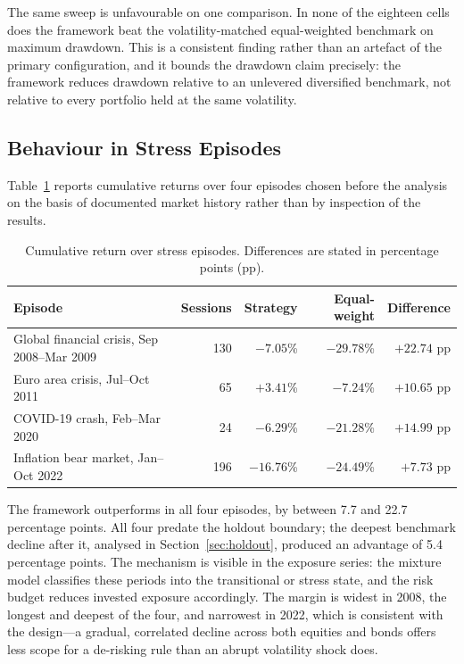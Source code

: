 \documentclass{singlecol-new}
\theoremstyle{TH}{
\newtheorem{lemma}{Lemma}
\newtheorem{theorem}[lemma]{Theorem}
\newtheorem{corrolary}[lemma]{Corrolary}
\newtheorem{conjecture}[lemma]{Conjecture}
\newtheorem{proposition}[lemma]{Proposition}
\newtheorem{claim}[lemma]{Claim}
\newtheorem{stheorem}[lemma]{Wrong Theorem}
\newtheorem{algorithm}{Algorithm}
}
\theoremstyle{THrm}{
\newtheorem{definition}{Definition}[section]
\newtheorem{question}{Question}[section]
\newtheorem{remark}{Remark}
\newtheorem{scheme}{Scheme}
}
\theoremstyle{THhit}{
\newtheorem{case}{Case}[section]
}
\begin{document}
The same sweep is unfavourable on one comparison. In none of the eighteen cells does
the framework beat the volatility-matched equal-weighted benchmark on maximum drawdown.
This is a consistent finding rather than an artefact of the primary configuration, and
it bounds the drawdown claim precisely: the framework reduces drawdown relative to an
unlevered diversified benchmark, not relative to every portfolio held at the same
volatility.

\subsection{Behaviour in Stress Episodes}

Table~\ref{tab:episodes} reports cumulative returns over four episodes chosen before the analysis on the
basis of documented market history rather than by inspection of the results.

\begin{table}[!ht]
\centering
\caption{Cumulative return over stress episodes. Differences are stated in percentage
points (pp).}
\label{tab:episodes}
\small
\begin{tabular}{p{3.6cm}rrrr}
\hline
\textbf{Episode} & \textbf{Sessions} & \textbf{Strategy} & \textbf{Equal-weight} & \textbf{Difference} \\
\hline
Global financial crisis, Sep 2008--Mar 2009 & 130 & $-7.05$\% & $-29.78$\% & $+22.74$ pp \\
Euro area crisis, Jul--Oct 2011 & 65 & $+3.41$\% & $-7.24$\% & $+10.65$ pp \\
COVID-19 crash, Feb--Mar 2020 & 24 & $-6.29$\% & $-21.28$\% & $+14.99$ pp \\
Inflation bear market, Jan--Oct 2022 & 196 & $-16.76$\% & $-24.49$\% & $+7.73$ pp \\
\hline
\end{tabular}
\end{table}

The framework outperforms in all four episodes, by between 7.7 and 22.7 percentage
points. All four predate the holdout boundary; the deepest benchmark decline after it,
analysed in Section~\ref{sec:holdout}, produced an advantage of 5.4 percentage points. The mechanism is visible in the exposure series: the mixture model classifies
these periods into the transitional or stress state, and the risk budget reduces
invested exposure accordingly. The margin is widest in 2008, the longest and deepest of
the four, and narrowest in 2022, which is consistent with the design---a gradual,
correlated decline across both equities and bonds offers less scope for a de-risking
rule than an abrupt volatility shock does.
\end{document}
